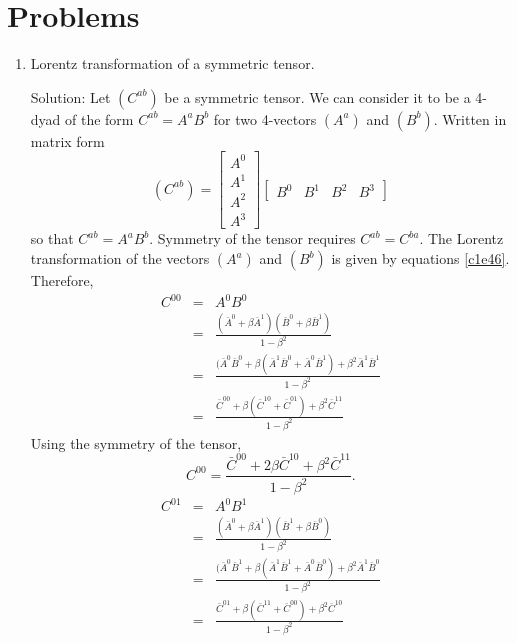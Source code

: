 \section{Problems}
\begin{enumerate}
\item Lorentz transformation of a symmetric tensor. 
\item[Solution:] Let $(C^{ab})$ be a symmetric tensor. We can consider it to
be a 4-dyad of the form $C^{ab} = A^a B^b$ for two 4-vectors $(A^a)$ 
and $(B^b)$. Written in matrix form
\begin{equation}\label{c1e87}
(C^{ab}) = \begin{bmatrix}A^0 \\ A^1 \\ A^2 \\ A^3\end{bmatrix}
\begin{bmatrix}B^0 & B^1 & B^2 & B^3 \end{bmatrix}
\end{equation}
so that $C^{ab} = A^a B^b$. Symmetry of the tensor requires $C^{ab}
= C^{b a}$. The Lorentz transformation of the vectors $(A^a)$ and $(B^b)$
is given by equations \eqref{c1e46}. Therefore,
\begin{eqnarray*}
C^{00} &=& A^0 B^0 \\
 &=& \frac{(\bar{A}^0 + \beta\bar{A}^1)(\bar{B}^0 + \beta\bar{B}^1)}
         {1 - \beta^2} \\
 &=& \frac{(\bar{A}^0\bar{B}^0 + \beta(\bar{A}^1\bar{B}^0 + \bar{A}^0\bar{B}^1) 
     + \beta^2\bar{A}^1\bar{B}^1}{1 - \beta^2} \\
 &=& \frac{\bar{C}^{00}+\beta(\bar{C}^{10}+\bar{C}^{01})+\beta^2\bar{C}^{11}}
     {1 - \beta^2}
\end{eqnarray*}
Using the symmetry of the tensor,
\begin{equation}\label{c1e88}
C^{00} = \frac{\bar{C}^{00} + 2\beta\bar{C}^{10} + \beta^2\bar{C}^{11}}
              {1 - \beta^2}.
\end{equation}
\begin{eqnarray*}
C^{01} &=& A^0 B^1 \\
 &=& \frac{(\bar{A}^0 + \beta\bar{A}^1)(\bar{B}^1 + \beta\bar{B}^0)}
          {1 - \beta^2} \\
 &=& \frac{(\bar{A}^0\bar{B}^1 + \beta(\bar{A}^1\bar{B}^1 + 
          \bar{A}^0\bar{B}^0) + \beta^2\bar{A}^1\bar{B}^0}{1 - \beta^2} \\
 &=& \frac{\bar{C}^{01} + \beta(\bar{C}^{11} + \bar{C}^{00}) + 
           \beta^2\bar{C}^{10}}{1 - \beta^2}

\end{eqnarray*}
\end{enumerate}
